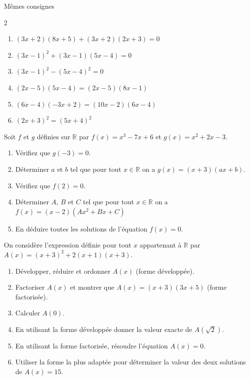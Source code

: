 \documentclass[main.tex]{subfiles}
\begin{document}
\vspace{-0.5em}
\begin{exercise}\label{chapter07:exercice:equationproduitB} Mêmes consignes \vspace{-0.5em}
\begin{multicols}{2}
\begin{enumerate}[leftmargin=*,label={$(E_{\arabic*})$}]
\item $(3x+2)(8x+5)+(3x+2)(2x+3)=0$ 
\item $(3x-1)^2+(3x-1)(5x-4)=0$ 
\item $(3x-1)^2-(5x-4)^2=0$ 
\item $(2x-5)(5x-4)=(2x-5)(8x-1)$ 
\item $(6x-4)(-3x+2)=(10x-2)(6x-4)$  
\item $(2x+3)^2=(5x+4)^2$ 
\end{enumerate}
\end{multicols} 
\end{exercise}
\vspace{-0.5em} 
\begin{exercise} Soit $f$ et $g$ définies sur $\mathbb{R}$ par $f(x)=x^3-7x+6$ et $g(x)=x^2+2x-3$.
\begin{enumerate}[label=\arabic*), leftmargin=*]
	\item Vérifiez que $g(-3)=0$.
	\item Déterminer $a$ et $b$ tel que  pour tout $x\in\mathbb{R}$ on a $g(x)=(x+3)(ax+b)$.
	\item Vérifiez que $f(2)=0$.
	\item Déterminer $A$, $B$ et $C$ tel que pour tout $x\in\mathbb{R}$ on a $f(x)=(x-2)(Ax^2+Bx+C)$
	\item En déduire toutes les solutions de l'équation $f(x)=0$.
\end{enumerate}
\end{exercise}

\begin{exercise}

On considère l'expression définie pour tout $x$ appartenant à $\mathbb{R}$ par $A(x) =(x+3)^2+2(x+1)(x+3)$.
\begin{enumerate}[label=\arabic*), leftmargin=*]
\item Développer, réduire et ordonner $A(x)$  (forme développée). 
\item Factoriser $A(x)$ et montrer que $A(x)=(x+3)(3x+5)$ (forme factorisée).
\item Calculer $A(0)$.
\item En utilisant la forme développée donner la valeur exacte de $A(\sqrt{2})$. 
\item En utilisant la forme factorisée, résoudre l'équation $A(x)=0$.
\item Utiliser la forme la plus adaptée pour déterminer la valeur des deux solutions de $A(x)=15$.
\end{enumerate}
\end{exercise}
\end{document}

